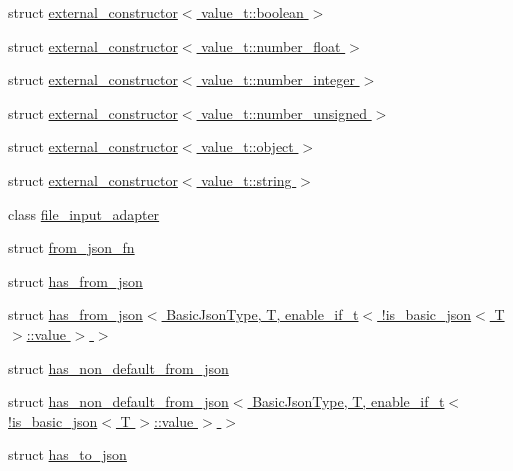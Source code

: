 \begin{DoxyCompactItemize}
\item 
struct \hyperlink{structnlohmann_1_1detail_1_1external__constructor_3_01value__t_1_1boolean_01_4}{external\+\_\+constructor$<$ value\+\_\+t\+::boolean $>$}
\item 
struct \hyperlink{structnlohmann_1_1detail_1_1external__constructor_3_01value__t_1_1number__float_01_4}{external\+\_\+constructor$<$ value\+\_\+t\+::number\+\_\+float $>$}
\item 
struct \hyperlink{structnlohmann_1_1detail_1_1external__constructor_3_01value__t_1_1number__integer_01_4}{external\+\_\+constructor$<$ value\+\_\+t\+::number\+\_\+integer $>$}
\item 
struct \hyperlink{structnlohmann_1_1detail_1_1external__constructor_3_01value__t_1_1number__unsigned_01_4}{external\+\_\+constructor$<$ value\+\_\+t\+::number\+\_\+unsigned $>$}
\item 
struct \hyperlink{structnlohmann_1_1detail_1_1external__constructor_3_01value__t_1_1object_01_4}{external\+\_\+constructor$<$ value\+\_\+t\+::object $>$}
\item 
struct \hyperlink{structnlohmann_1_1detail_1_1external__constructor_3_01value__t_1_1string_01_4}{external\+\_\+constructor$<$ value\+\_\+t\+::string $>$}
\item 
class \hyperlink{classnlohmann_1_1detail_1_1file__input__adapter}{file\+\_\+input\+\_\+adapter}
\item 
struct \hyperlink{structnlohmann_1_1detail_1_1from__json__fn}{from\+\_\+json\+\_\+fn}
\item 
struct \hyperlink{structnlohmann_1_1detail_1_1has__from__json}{has\+\_\+from\+\_\+json}
\item 
struct \hyperlink{structnlohmann_1_1detail_1_1has__from__json_3_01BasicJsonType_00_01T_00_01enable__if__t_3_01_9is3ee028c64c76c768be45996bb13fc9c5}{has\+\_\+from\+\_\+json$<$ Basic\+Json\+Type, T, enable\+\_\+if\+\_\+t$<$ !is\+\_\+basic\+\_\+json$<$ T $>$\+::value $>$ $>$}
\item 
struct \hyperlink{structnlohmann_1_1detail_1_1has__non__default__from__json}{has\+\_\+non\+\_\+default\+\_\+from\+\_\+json}
\item 
struct \hyperlink{structnlohmann_1_1detail_1_1has__non__default__from__json_3_01BasicJsonType_00_01T_00_01enable__b7a8cd863889b54d1139b207b4233111}{has\+\_\+non\+\_\+default\+\_\+from\+\_\+json$<$ Basic\+Json\+Type, T, enable\+\_\+if\+\_\+t$<$ !is\+\_\+basic\+\_\+json$<$ T $>$\+::value $>$ $>$}
\item 
struct \hyperlink{structnlohmann_1_1detail_1_1has__to__json}{has\+\_\+to\+\_\+json}

\end{DoxyCompactItemize}
